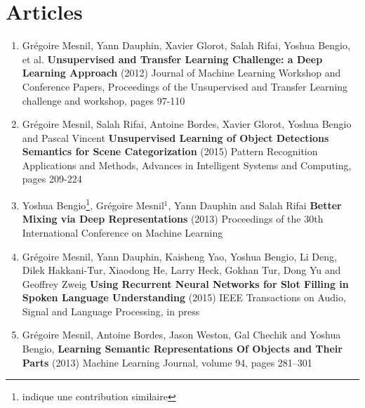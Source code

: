 \chapter*{Articles}

\begin{enumerate}

\item Grégoire Mesnil, Yann Dauphin, Xavier Glorot, Salah Rifai, Yoshua Bengio,
et al. {\bf Unsupervised and Transfer Learning Challenge: a Deep Learning
Approach} (2012) Journal of Machine Learning Workshop and Conference Papers,
Proceedings of the Unsupervised and Transfer Learning challenge and workshop, pages 97-110

\item Grégoire Mesnil, Salah Rifai, Antoine Bordes, Xavier Glorot, Yoshua Bengio and Pascal Vincent
{\bf Unsupervised Learning of Object Detections Semantics for Scene Categorization}
(2015) Pattern Recognition Applications and Methods, Advances in Intelligent Systems and Computing, pages 209-224

\item Yoshua Bengio\footnote{indique une contribution similaire}, Grégoire Mesnil$^{1}$, Yann Dauphin and Salah Rifai
{\bf Better Mixing via Deep Representations} (2013) 
Proceedings of the 30th International Conference on Machine Learning 

\item Grégoire Mesnil, Yann Dauphin, Kaisheng Yao, Yoshua Bengio, Li Deng, Dilek Hakkani-Tur, Xiaodong He, Larry Heck, Gokhan Tur, Dong Yu and Geoffrey Zweig {\bf Using Recurrent Neural Networks for Slot Filling in Spoken Language Understanding} (2015) IEEE Transactions on Audio, Signal and Language Processing, in press

\item Grégoire Mesnil, Antoine Bordes, Jason Weston,
Gal Chechik and Yoshua Bengio, {\bf Learning Semantic Representations Of
Objects and Their Parts} (2013) Machine Learning Journal, volume 94, pages 281–301

\end{enumerate}

